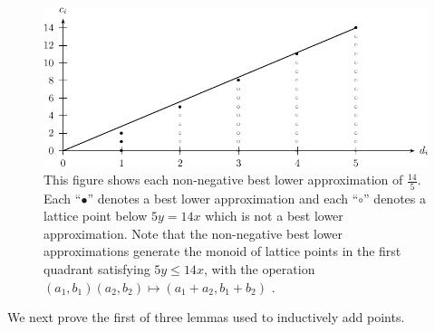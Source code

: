 \documentclass{amsart}
\theoremstyle{plain}
\theoremstyle{definition}
\theoremstyle{remark}
\numberwithin{equation}{section}
\begin{document}
\begin{figure}
\includegraphics{pics/spin-lower-approximations-pic-pics.pdf}
\caption{This figure shows each non-negative best lower approximation of $\frac{14}{5}.$ Each ``$\bullet$'' denotes a best lower approximation and each ``$\circ$'' denotes a lattice point below $5y=14x$ which is not a best lower approximation.  Note that the non-negative best lower approximations generate the monoid of lattice points in the first quadrant satisfying  $5y \le 14x$, with the operation $(a_1, b_1)(a_2, b_2)\mapsto (a_1 + a_2, b_1 + b_2)$ .}\label{fig:s14/5-lattice}
\end{figure}

We next prove the first of three lemmas used to inductively add points.
\end{document}

